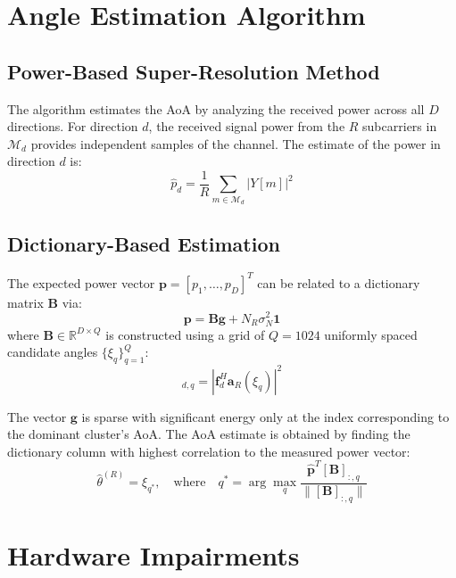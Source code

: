 \documentclass[12pt,letterpaper]{article}
\begin{document}
\section{Angle Estimation Algorithm}

\subsection{Power-Based Super-Resolution Method}

The algorithm estimates the AoA by analyzing the received power across all $D$ directions. For direction $d$, the received signal power from the $R$ subcarriers in $\mathcal{M}_d$ provides independent samples of the channel. The estimate of the power in direction $d$ is:
\begin{equation}
\hat{p}_d = \frac{1}{R} \sum_{m \in \mathcal{M}_d} |Y[m]|^2
\end{equation}

\subsection{Dictionary-Based Estimation}

The expected power vector $\mathbf{p} = [p_1, \ldots, p_D]^T$ can be related to a dictionary matrix $\mathbf{B}$ via:
\begin{equation}
\mathbf{p} = \mathbf{B}\mathbf{g} + N_R\sigma_N^2 \mathbf{1}
\end{equation}
where $\mathbf{B} \in \mathbb{R}^{D \times Q}$ is constructed using a grid of $Q = 1024$ uniformly spaced candidate angles $\{\xi_q\}_{q=1}^Q$:
\begin{equation}
[\mathbf{B}]_{d,q} = |\mathbf{f}_d^H \mathbf{a}_R(\xi_q)|^2
\end{equation}

\noindent
The vector $\mathbf{g}$ is sparse with significant energy only at the index corresponding to the dominant cluster's AoA. The AoA estimate is obtained by finding the dictionary column with highest correlation to the measured power vector:
\begin{equation}
\hat{\theta}^{(R)} = \xi_{q^*}, \quad \text{where} \quad q^* = \arg\max_q \frac{\hat{\mathbf{p}}^T [\mathbf{B}]_{:,q}}{\|[\mathbf{B}]_{:,q}\|}
\end{equation}

\section{Hardware Impairments}
\end{document}
